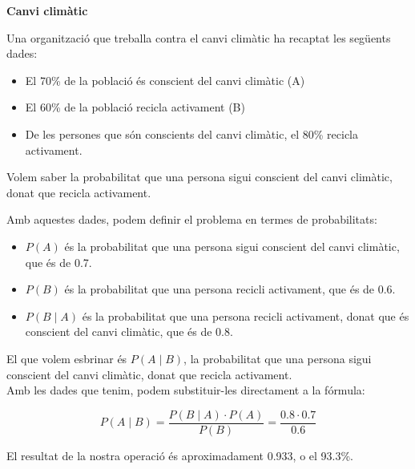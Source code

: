 \documentclass[12pt]{article}
\begin{document}
\begin{exemple} [title=Exemple 2]\noindent 
\textbf{Canvi climàtic}

Una organització que treballa contra el canvi climàtic ha recaptat les següents dades:

\begin{itemize}
    \item El 70\% de la població és conscient del canvi climàtic (A)
    \item El 60\% de la població recicla activament (B)
    \item De les persones que són conscients del canvi climàtic, el 80\% recicla activament.
\end{itemize}
Volem saber la probabilitat que una persona sigui conscient del canvi climàtic, donat que recicla activament.

\end{exemple}

\begin{exemple} [title=] \noindent
Amb aquestes dades, podem definir el problema en termes de probabilitats:

\begin{itemize}
    \item \(P(A)\) és la probabilitat que una persona sigui conscient del canvi climàtic, que és de 0.7.
    \item \(P(B)\) és la probabilitat que una persona recicli activament, que és de 0.6.
    \item \(P(B \mid A)\) és la probabilitat que una persona recicli activament, donat que és conscient del canvi climàtic, que és de 0.8.
\end{itemize}

El que volem esbrinar és \(P(A \mid B)\), la probabilitat que una persona sigui conscient del canvi climàtic, donat que recicla activament.\\

Amb les dades que tenim, podem substituir-les directament a la fórmula:

\[
P(A \mid B) = \frac{P(B \mid A) \cdot P(A)}{P(B)} = \frac{0.8 \cdot 0.7}{0.6}
\]

El resultat de la nostra operació és aproximadament 0.933, o el 93.3\%.
\end{exemple}
\end{document}
